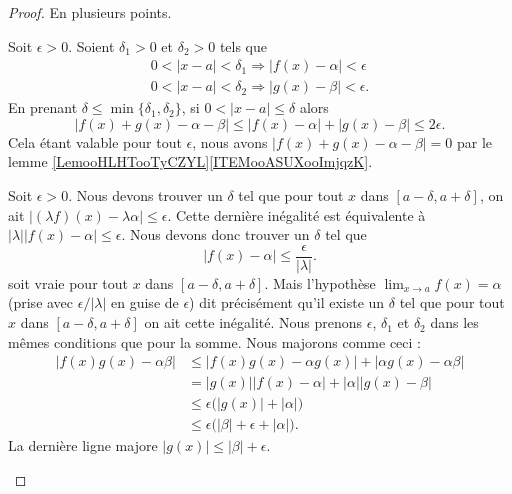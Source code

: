 \begin{proof}
	En plusieurs points.
	\begin{subproof}
		\spitem[La somme]
		Soit \( \epsilon>0\). Soient \( \delta_1>0\) et \( \delta_2>0\) tels que
		\begin{subequations}
			\begin{align}
				0<| x-a |<\delta_1\Rightarrow | f(x)-\alpha |<\epsilon \\
				0<| x-a |<\delta_2\Rightarrow | g(x)-\beta |<\epsilon.
			\end{align}
		\end{subequations}
		En prenant \( \delta\leq \min\{ \delta_1,\delta_2 \}\), si \( 0<| x-a |\leq \delta\) alors
		\begin{equation}
			| f(x)+g(x)-\alpha-\beta |\leq | f(x)-\alpha |+| g(x)-\beta |\leq 2\epsilon.
		\end{equation}
		Cela étant valable pour tout \( \epsilon\), nous avons \( | f(x)+g(x)-\alpha-\beta |=0\) par le lemme \ref{LemooHLHTooTyCZYL}\ref{ITEMooASUXooImjqzK}.

		Soit \( \epsilon>0\). Nous devons trouver un \( \delta\) tel que pour tout \( x\) dans \( [a-\delta,a+\delta]\), on ait \( | (\lambda f)(x)- \lambda \alpha |\leq\epsilon\). Cette dernière inégalité est équivalente à \( |\lambda|| f(x)-\alpha |\leq\epsilon\). Nous devons donc trouver un \( \delta\) tel que
		\begin{equation}
			| f(x)-\alpha |\leq\frac{ \epsilon }{ | \lambda | }.
		\end{equation}
		soit vraie pour tout \( x\) dans \( [a-\delta,a+\delta]\). Mais l'hypothèse \( \lim_{x\to a}f(x)=\alpha\) (prise avec \( \epsilon/| \lambda |\) en guise de \( \epsilon\)) dit précisément qu'il existe un \( \delta\) tel que pour tout \( x\) dans \( [a-\delta,a+\delta]\) on ait cette inégalité.
		\spitem[Le produit]
		Nous prenons \( \epsilon\), \( \delta_1\) et \( \delta_2\) dans les mêmes conditions que pour la somme. Nous majorons comme ceci :
		\begin{subequations}
			\begin{align}
				| f(x)g(x)-\alpha\beta | & \leq | f(x)g(x)-\alpha g(x) |+| \alpha g(x)-\alpha\beta | \\
				                         & =| g(x) | |f(x)-\alpha |+| \alpha | |g(x)-\beta |         \\
				                         & \leq   \epsilon\big(  | g(x) |  +| \alpha |   \big)       \\
				                         & \leq \epsilon\big( | \beta |+\epsilon+| \alpha | \big).
			\end{align}
		\end{subequations}
		La dernière ligne majore \( | g(x) |\leq | \beta |+\epsilon\).


\end{subproof}
\end{proof}
